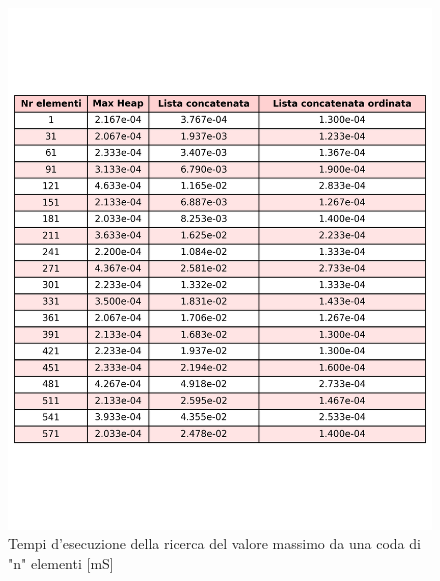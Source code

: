 \documentclass{article}
\begin{document}
\begin{figure}[h]
    \centering
    \includegraphics[width=\textwidth]{Images/TempoRicercaMassimo.png}
    \caption{Tempi d'esecuzione della ricerca del valore massimo da una coda di "n" elementi [mS]}
    \label{fig:TabellaRicerca}
\end{figure}
\end{document}
